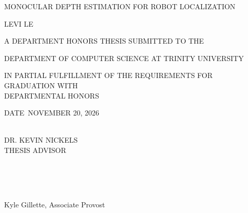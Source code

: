 \newcommand{\coverTitle}{Monocular Depth Estimation for Robot Localization}      %
\newcommand{\coverAuthor}{LEVI LE}      %
\newcommand{\coverDepartment}{}             %
\newcommand{\coverDate}{NOVEMBER 20, 2026}                   %
\newcommand{\coverAdvisor}{DR. KEVIN NICKELS}  %
\newcommand{\coverChair}{DR. YU ZHANG}      %
\newcommand{\coverAVPAA}{Kyle Gillette, Associate Provost}

\newcommand{\coverfield}[2]{\underline{\makebox[#1]{#2}}}

\begin{titlepage}
\thispagestyle{empty}
\singlespacing
\centering

\vspace*{0.25in}
{\large\MakeUppercase{\coverTitle}\par}
\vspace{0.2in}
{\coverAuthor\par}

\vspace{1.0in}
A DEPARTMENT HONORS THESIS SUBMITTED TO THE\par
\vspace{0.15in}
DEPARTMENT OF COMPUTER SCIENCE AT TRINITY UNIVERSITY\par
\vspace{0.15in}
IN PARTIAL FULFILLMENT OF THE REQUIREMENTS FOR GRADUATION WITH\\
DEPARTMENTAL HONORS\par

\vspace{1.0in}
DATE\ \coverDate\par

\vspace{1.3in}
\noindent
\begin{minipage}[t]{0.45\textwidth}
  \raggedright
  \coverfield{2.4in}{}\\[0.1in]
  \coverAdvisor\\[0.05in]
  THESIS ADVISOR
\end{minipage}%
\hfill
\begin{minipage}[t]{0.45\textwidth}
  \raggedleft
  \coverfield{2.75in}{}\\[0.1in]
  \makebox[2.75in][l]{\coverChair}\\[0.05in]
\end{minipage}

\vfill
\coverfield{3.2in}{}\\[0.15in]
\coverAVPAA\par

\end{titlepage}

